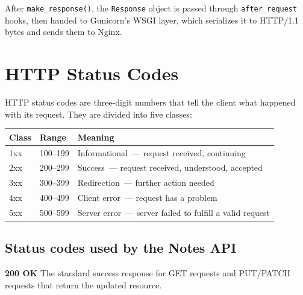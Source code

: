 \noindent{}After \texttt{make\_response()}, the \texttt{Response} object is passed through \texttt{after\_request} hooks, then handed to Gunicorn's WSGI layer, which serializes it to HTTP/1.1 bytes and sends them to Nginx.

\setcounter{section}{1}
\section{HTTP Status Codes}\label{34-response-handling:342-http-status-codes}

HTTP status codes are three-digit numbers that tell the client what happened with its request. They are divided into five classes:


{\def\LTcaptype{none} %
\begin{longtable}[]{@{}lll@{}}
\toprule\noalign{}
Class & Range & Meaning \\
\midrule\noalign{}
\endhead
\bottomrule\noalign{}
\endlastfoot
1xx & 100--199 & Informational~--- request received, continuing \\
2xx & 200--299 & Success~--- request received, understood, accepted \\
3xx & 300--399 & Redirection~--- further action needed \\
4xx & 400--499 & Client error~--- request has a problem \\
5xx & 500--599 & Server error~--- server failed to fulfill a valid request \\
\end{longtable}
}

\subsection*{Status codes used by the Notes API}\label{34-response-handling:status-codes-used-by-the-notes-api}

\textbf{200 OK}
The standard success response for GET requests and PUT/PATCH requests that return the updated resource.

\begin{codebox}[short]

\begin{Shaded}
\begin{Highlighting}[]
\end{Highlighting}
\end{Shaded}

\end{codebox}


